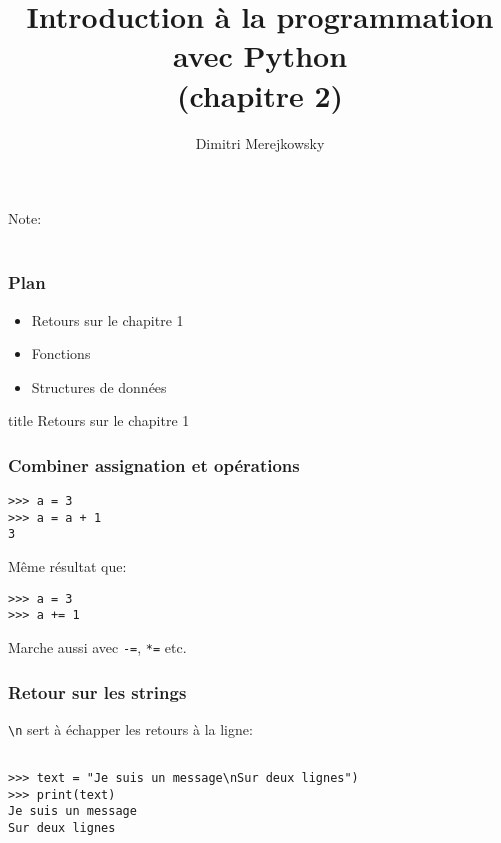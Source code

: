 \documentclass{beamer}
\title{Introduction à la programmation avec Python \\ (chapitre 2)}
\author{Dimitri Merejkowsky}
\institute{E2L}
\begin{document}
\frame{\titlepage}

\begin{frame}

Note: \\~\\


\end{frame}


\begin{frame}

\frametitle{Plan}

\begin{itemize}
  \item Retours sur le chapitre 1
  \item Fonctions
  \item Structures de données
\end{itemize}

\end{frame}


\begin{frame}[fragile]
  \centering
  \begin{beamercolorbox}[sep=8pt,center,shadow=true,rounded=true]{title}
    Retours sur le chapitre 1
  \end{beamercolorbox}
\end{frame}


\begin{frame}[fragile]
  \frametitle{Combiner assignation et opérations}

\begin{lstlisting}
>>> a = 3
>>> a = a + 1
3
\end{lstlisting}

Même résultat que:

\begin{lstlisting}
>>> a = 3
>>> a += 1
\end{lstlisting}

\vfill

Marche aussi avec \texttt{-=}, \texttt{*=} etc.

\end{frame}

\begin{frame}[fragile]
  \frametitle{Retour sur les strings}

\texttt{\textbackslash n} sert à échapper les retours à la ligne:

\begin{lstlisting}

>>> text = "Je suis un message\nSur deux lignes")
>>> print(text)
Je suis un message
Sur deux lignes
\end{lstlisting}

\end{frame}
\end{document}
